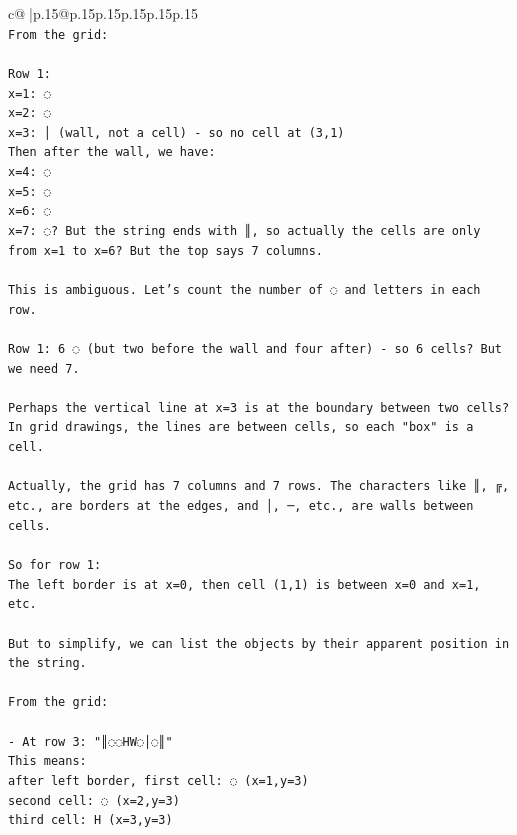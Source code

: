 \documentclass{article}
\begin{document}
{\begin{supertabular}{c@{$\;$}|p{.15\linewidth}@{}p{.15\linewidth}p{.15\linewidth}p{.15\linewidth}p{.15\linewidth}p{.15\linewidth}}
{{{\\ 
\texttt{From the grid:} \\
\\ 
\texttt{Row 1: } \\
\texttt{x=1: ◌} \\
\texttt{x=2: ◌} \\
\texttt{x=3: │ (wall, not a cell) {-} so no cell at (3,1)} \\
\texttt{Then after the wall, we have:} \\
\texttt{x=4: ◌} \\
\texttt{x=5: ◌} \\
\texttt{x=6: ◌} \\
\texttt{x=7: ◌? But the string ends with ║, so actually the cells are only from x=1 to x=6? But the top says 7 columns.} \\
\\ 
\texttt{This is ambiguous. Let's count the number of ◌ and letters in each row.} \\
\\ 
\texttt{Row 1: 6 ◌ (but two before the wall and four after) {-} so 6 cells? But we need 7.} \\
\\ 
\texttt{Perhaps the vertical line at x=3 is at the boundary between two cells? In grid drawings, the lines are between cells, so each "box" is a cell.} \\
\\ 
\texttt{Actually, the grid has 7 columns and 7 rows. The characters like ║, ╔, etc., are borders at the edges, and │, ─, etc., are walls between cells.} \\
\\ 
\texttt{So for row 1:} \\
\texttt{The left border is at x=0, then cell (1,1) is between x=0 and x=1, etc.} \\
\\ 
\texttt{But to simplify, we can list the objects by their apparent position in the string.} \\
\\ 
\texttt{From the grid:} \\
\\ 
\texttt{{-} At row 3: "║◌◌HW◌│◌║"} \\
\texttt{This means: } \\
\texttt{after left border, first cell: ◌ (x=1,y=3)} \\
\texttt{second cell: ◌ (x=2,y=3)} \\
\texttt{third cell: H (x=3,y=3)} \\
}}}
\end{supertabular}}
\end{document}
